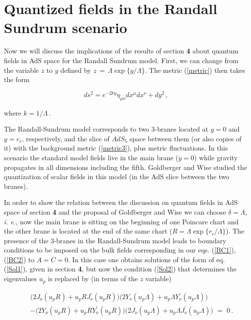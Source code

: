 \documentclass[a4paper,12pt]{article}
\begin{document}
\section{Quantized fields in the Randall Sundrum scenario}
\label{RS}


Now we will discuss the implications of the results of section {\bf 4} 
about quantum fields in AdS space for the Randall Sundrum model.
First, we can change from the variable $z$ to $y$ 
defined by $ z\,=\, \Lambda \exp\{ y / \Lambda\} $. 
The metric (\ref{metric}) then takes the form 

\begin{equation}
\label{metric3}
ds^2=e^{-2ky}\eta_{\mu\nu}dx^\mu dx^\nu +dy^2\,,
\end{equation}

\noindent where $k = 1/\Lambda \,$. 

The Randall-Sundrum model\cite{RS1,RS2} corresponds to two 3-branes 
located at $y = 0$ and $y = r_c$, respectively, and the slice
of $AdS_5$ space between them (or also copies of it) 
with the background metric (\ref{metric3}), 
plus metric fluctuations.  
In this scenario the standard model fields live in the main
brane ($y = 0$) while gravity propagates in all dimensions including 
the fifth. 
Goldberger and Wise \cite{GW1}  studied the quantization of scalar 
fields in this model (in the AdS slice between the two branes).

In order to show the relation between the discussion on quantum fields in 
AdS space of section {\bf 4} and the proposal of Goldberger and Wise 
we can choose  $\delta = \Lambda$, {\sl i. e.}, now the main brane
is sitting on the beginning of one Poincare chart and the other brane 
is located at the end of the same chart ($R=\Lambda\exp\{r_c/\Lambda\}$).
The presence of the 3-branes in the Randall-Sundrum model leads to  
boundary conditions to be imposed on the bulk fields corresponding in 
our eqs. (\ref{BC1}),(\ref{BC2}) to $A = C = 0$.
In this case one obtains  solutions of the form of eq. (\ref{Sol1}), 
given in section {\bf 4}, but now the condition (\ref{Sol2}) 
that determines the eigenvalues $u_p$ is replaced by (in terms of the $z$ 
variable)

\begin{eqnarray}
&&\Big(2 J_{\nu}(u_p R ) + u_p R J^\prime_{\nu}(u_p R )\Big)
\Big( 2 Y_{\nu}(u_p \Lambda ) + 
u_p \Lambda Y^\prime_{\nu}(u_p \Lambda )\Big)\nonumber\\
&& - \Big( 2 Y_{\nu}(u_p R ) + u_p R Y^\prime_{\nu}(u_p R )\Big)
\Big( 2 J_{\nu}(u_p \Lambda ) + 
u_p \Lambda J^\prime_{\nu}(u_p \Lambda )\Big)\,\,=\,\,0\,.
\end{eqnarray}
\end{document}
